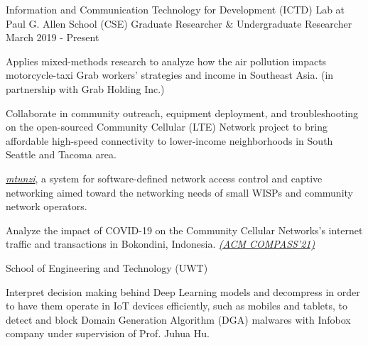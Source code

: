 

\begin{cventries}


  \cventry
    {Information and Communication Technology for Development (ICTD) Lab at Paul G. Allen School (CSE)} %
    {Graduate Researcher \& Undergraduate Researcher} %
    {March 2019 - Present} %
    {} %
    {
      \begin{cvitems} %
        \item {
          Applies mixed-methods research to analyze how the air pollution impacts motorcycle-taxi Grab workers' strategies and income in Southeast Asia. (in partnership with Grab Holding Inc.)
        }
        \item {
          Collaborate in community outreach, equipment deployment, and troubleshooting on the open-sourced Community Cellular (LTE) Network project to bring affordable high-speed connectivity to lower-income neighborhoods in South Seattle and Tacoma area.
        }  
        \item{
            \href{https://github.com/innoobijr/cse-550-finalproject-mtunzi}{\textit{mtunzi}}, a system for software-defined network access control and captive networking aimed toward the networking needs of small WISPs and community network operators.
        }
        \item {
          Analyze the impact of COVID-19 on the Community Cellular Networks's internet traffic and transactions in Bokondini, Indonesia. \href{https://dl.acm.org/doi/10.1145/3460112.3472311}{\textit{(ACM COMPASS'21)}}
        }
      \end{cvitems}
    }
  \cventry
    {School of Engineering and Technology (UWT) } %
    {} %
    {} %
    {} 
    {
      \begin{cvitems} %
        \item {
          Interpret decision making behind Deep Learning models and decompress in order to have them operate in IoT devices efficiently, such as mobiles and tablets, to detect and block Domain Generation Algorithm (DGA) malwares with Infobox company under supervision of Prof. Juhua Hu.
        }
      \end{cvitems}
    }


\end{cventries}
